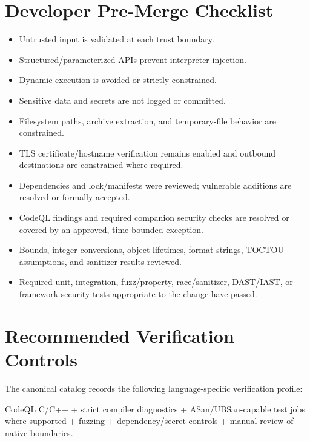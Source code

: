\documentclass[10pt,letterpaper]{article}
\begin{document}
\section{Developer Pre-Merge Checklist}
\begin{itemize}[leftmargin=*,itemsep=2pt]
\item Untrusted input is validated at each trust boundary.
\item Structured/parameterized APIs prevent interpreter injection.
\item Dynamic execution is avoided or strictly constrained.
\item Sensitive data and secrets are not logged or committed.
\item Filesystem paths, archive extraction, and temporary-file behavior are constrained.
\item TLS certificate/hostname verification remains enabled and outbound destinations are constrained where required.
\item Dependencies and lock/manifests were reviewed; vulnerable additions are resolved or formally accepted.
\item CodeQL findings and required companion security checks are resolved or covered by an approved, time-bounded exception.
\item Bounds, integer conversions, object lifetimes, format strings, TOCTOU assumptions, and sanitizer results reviewed.
\item Required unit, integration, fuzz/property, race/sanitizer, DAST/IAST, or framework-security tests appropriate to the change have passed.
\end{itemize}

\section{Recommended Verification Controls}
The canonical catalog records the following language-specific verification profile:

CodeQL C/C++ + strict compiler diagnostics + ASan/UBSan-capable test jobs where supported + fuzzing + dependency/secret controls + manual review of native boundaries.
\end{document}
